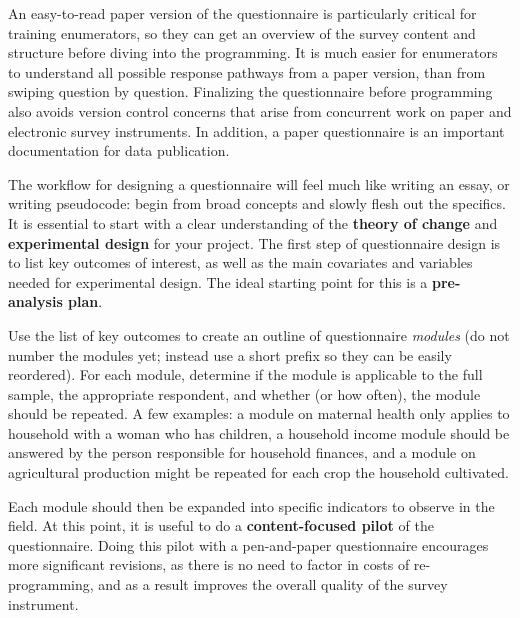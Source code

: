 An easy-to-read paper version of the questionnaire is particularly critical for training enumerators, so they can get an overview of the survey content and structure before diving into the programming. It is much easier for enumerators to understand all possible response pathways from a paper version, than from swiping question by question. Finalizing the questionnaire before programming also avoids version control concerns that arise from concurrent work on paper and electronic survey instruments. In addition, a paper questionnaire is an important documentation for data publication. 

The workflow for designing a questionnaire will feel much like writing an essay, or writing pseudocode: begin from broad concepts and slowly flesh out the specifics. It is essential to start with a clear understanding of the 
\textbf{theory of change}  and \textbf{experimental design} for your project.
The first step of questionnaire design is to list key outcomes of interest, as well as the main covariates and variables needed for experimental design. 
The ideal starting point for this is a \textbf{pre-analysis plan}. 

Use the list of key outcomes to create an outline of questionnaire \textit{modules} (do not number the modules yet; instead use a short prefix so they can be easily reordered). For each module, determine if the module is applicable to the full sample, the appropriate respondent, and whether (or how often), the module should be repeated. A few examples: a module on maternal health only applies to household with a woman who has children, a household income module should be answered by the person responsible for household finances, and a module on agricultural production might be repeated for each crop the household cultivated. 

Each module should then be expanded into specific indicators to observe in the field. 
At this point, it is useful to do a  \textbf{content-focused pilot}  of the questionnaire. 
Doing this pilot with a pen-and-paper questionnaire encourages more significant revisions, as there is no need to factor in costs of re-programming, and as a result improves the overall quality of the survey instrument. 

